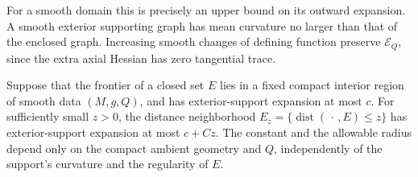 For a smooth domain this is precisely an upper bound on its outward
expansion.  A smooth exterior supporting graph has mean curvature no
larger than that of the enclosed graph.  Increasing smooth changes of
defining function preserve \(\mathcal E_Q\), since the extra axial
Hessian has zero tangential trace.

\begin{lemma}
\label{lem:fl-support-parallel}
Suppose that the frontier of a closed set \(E\) lies in a fixed compact
interior region of smooth data \((M,g,Q)\), and has exterior-support
expansion at most \(c\).  For sufficiently small \(z>0\), the distance
neighborhood \(E_z=\{\operatorname{dist}(\,\cdot\,,E)\le z\}\) has
exterior-support expansion at most \(c+Cz\).
The constant and the allowable radius depend only on the compact
ambient geometry and \(Q\), independently of the support's curvature
and the regularity of \(E\).
\end{lemma}

